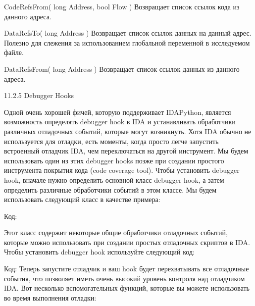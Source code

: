 \documentclass[12pt, a4paper, oneside]{book}
\begin{document}
CodeRefsFrom( long Address, bool Flow )
Возвращает список ссылок кода из данного адреса.

DataRefsTo( long Address )
Возвращает список ссылок данных на данный адрес. Полезно для слежения за использованием глобальной переменной в исследуемом файле.

DataRefsFrom( long Address )
Возвращает список ссылок данных из данного адреса. 

11.2.5 Debugger Hooks

Одной очень хорошей фичей, которую поддерживает IDAPython, является возможность определять debugger hook в IDA и устанавливать обработчики различных отладочных событий, которые могут возникнуть. Хотя IDA обычно не используется для отладки, есть моменты, когда просто легче запустить встроенный отладчик IDA, чем переключаться на другой инструмент. Мы будем использовать один из этих debugger hooks позже при создании простого инструмента покрытия кода (code coverage tool). Чтобы установить debugger hook, вначале нужно определить основной класс debugger hook, а затем определить различные обработчики событий в этом классе. Мы будем использовать следующий класс в качестве примера:

Код:



Этот класс содержит некоторые общие обработчики отладочных событий, которые можно использовать при создании простых отладочных скриптов в IDA. Чтобы установить debugger hook используйте следующий код:

Код:
Теперь запустите отладчик и ваш hook будет перехватывать все отладочные события, что позволяет иметь очень высокий уровень контроля над отладчиком IDA. Вот несколько вспомогательных функций, которые вы можете использовать во время выполнения отладки:
\end{document}
